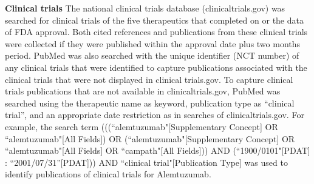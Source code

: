 \documentclass[10pt,letterpaper]{article}
\newlength\savedwidth
\newcommand\thickhline{\noalign{\global\savedwidth\arrayrulewidth\global\arrayrulewidth 2pt}%
\hline
\noalign{\global\arrayrulewidth\savedwidth}}
\begin{document}
\begin{table}[!ht]
\centering
{}
\vspace{2 mm}
\caption{
{\bf Case Studies of Five Anti-Cancer Agents} Five anti-cancer therapeutics, with FDA approval dates ranging from 2001 to 2014, were selected as case studies. The active ingredient for each of these five therapeutics is listed in column 1. While multiple patents are typically associated with a drug or biological, the single US patent number displayed represents the primary invention that preceded approval of the therapeutic. The publication date for each patent is listed in the last column.}
\label{table1}
\end{table}

\textbf{Clinical trials} The national clinical trials database (clinicaltrials.gov) was searched for clinical trials of the five therapeutics that completed on or the data of FDA approval. Both cited references and publications from these clinical trials were collected if they were published within the approval date plus two months period. PubMed was also searched with the unique identifier (NCT number) of any clinical trials that were identified to capture publications associated with the clinical trials that were not displayed in clinical trials.gov. To capture clinical trials publications that are not available in clinicaltrials.gov, PubMed was searched using the therapeutic name as keyword, publication type as ``clinical trial'', and an appropriate date restriction as in searches of clinicaltrials.gov. For example, the search term (((``alemtuzumab"[Supplementary Concept] OR ``alemtuzumab"[All Fields]) OR (``alemtuzumab"[Supplementary Concept] OR ``alemtuzumab"[All Fields] OR ``campath"[All Fields])) AND (``1900/0101"[PDAT] : ``2001/07/31''[PDAT])) AND ``clinical trial"[Publication Type] was used to identify publications of clinical trials for Alemtuzumab.
\end{document}
